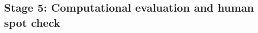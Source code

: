 \documentclass[referee,lineno,pdflatex,sn-vancouver-num]{sn-jnl}
\theoremstyle{thmstyleone}%
\theoremstyle{thmstyletwo}%
\theoremstyle{thmstylethree}%
\begin{document}
\subsection{Stage 5: Computational evaluation and human spot check}\label{sec:stage5}
\end{document}
